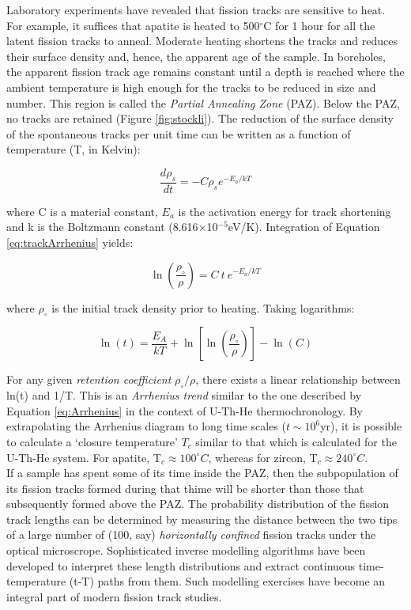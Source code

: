 \documentclass{book}
\begin{document}
Laboratory experiments have revealed that fission tracks are sensitive
to heat.  For example, it suffices that apatite is heated to
500$^{\circ}$C for 1 hour for all the latent fission tracks to
anneal. Moderate heating shortens the tracks and reduces their surface
density and, hence, the apparent age of the sample. In boreholes, the
apparent fission track age remains constant until a depth is reached
where the ambient temperature is high enough for the tracks to be
reduced in size and number.  This region is called the \emph{Partial
  Annealing Zone} (PAZ). Below the PAZ, no tracks are retained (Figure
\ref{fig:stockli}). The reduction of the surface density of the
spontaneous tracks per unit time can be written as a function of
temperature (T, in Kelvin):

\begin{equation}
\frac{d\rho_s}{dt} = -C \rho_s e^{-E_a/kT}
\label{eq:trackArrhenius}
\end{equation}

where C is a material constant, $E_a$ is the activation energy for
track shortening and k is the Boltzmann constant
(8.616$\times$10$^{-5}$eV/K). Integration of Equation
\ref{eq:trackArrhenius} yields:

\begin{equation}
\ln\left(\frac{\rho_\circ}{\rho}\right) = C~t~e^{-E_a/kT}
\label{eq:lnrho0rho}
\end{equation}

where $\rho_\circ$ is the initial track density prior to
heating. Taking logarithms:

\begin{equation}
\ln(t) = \frac{E_A}{kT} + \ln\left[\ln\left(\frac{\rho_\circ}{\rho}\right)\right] - \ln(C)
\label{eq:lnt}
\end{equation}

For any given \emph{retention coefficient} $\rho_\circ/\rho$, there
exists a linear relationship between ln(t) and 1/T. This is an
\emph{Arrhenius trend} similar to the one described by Equation
\ref{eq:Arrhenius} in the context of U-Th-He thermochronology.  By
extrapolating the Arrhenius diagram to long time scales
($t\sim10^6$yr), it is possible to calculate a `closure temperature'
$T_c$ similar to that which is calculated for the U-Th-He system. For
apatite, T$_c \approx 100^{\circ}C$, whereas for zircon, T$_c \approx
240^{\circ}C$.\\

If a sample has spent some of its time inside the PAZ, then the
subpopulation of its fission tracks formed during that thime will be
shorter than those that subsequently formed above the PAZ. The
probability distribution of the fission track lengths can be
determined by measuring the distance between the two tips of a large
number of (100, say) \emph{horizontally confined} fission tracks under
the optical microscrope.  Sophisticated inverse modelling algorithms
have been developed to interpret these length distributions and
extract continuous time-temperature (t-T) paths from them. Such
modelling exercises have become an integral part of modern fission
track studies.
\end{document}
